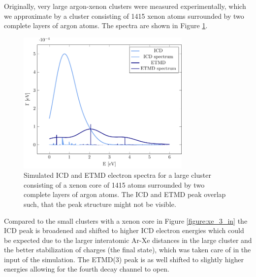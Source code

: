 Originally, very large argon-xenon clusters were measured experimentally,
which we approximate by a cluster consisting of 1415 xenon atoms surrounded
by two complete layers of argon atoms. The spectra are shown in Figure
\ref{figure:xe_8_lay1}.

\begin{figure}[h]
 \centering
 \includegraphics[width=8.5cm]{pics/xe_8_1lay.pdf}
 \caption{Simulated ICD and ETMD electron spectra for a large cluster consisting
          of a xenon core of 1415 atoms surrounded by two complete layers of
          argon atoms. The ICD and ETMD peak overlap such, that the peak structure
          might not be visible.}
 \label{figure:xe_8_lay1}
\end{figure}

Compared to the small clusters with a xenon core in Figure \ref{figure:xe_3_in}
the ICD peak is broadened and shifted to higher ICD electron energies which could be
expected due to the larger interatomic Ar-Xe distances in the large cluster and
the better stabilization of charges (the final state), which was taken care of
in the input of the simulation.
The ETMD(3) peak is as well shifted to slightly higher energies allowing for the
fourth decay channel to open.
